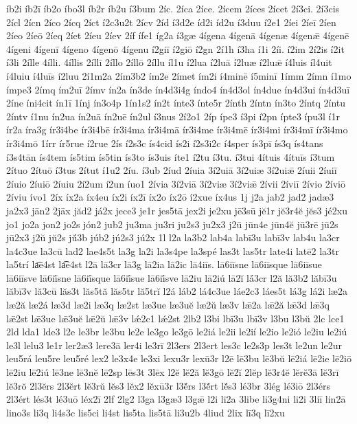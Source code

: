 {íb2i
íb2ī
íb2o
íbo3l
íb2r
íb2u
í3bum
2íc.
2íca
2íce.
2ícem
2íces
2ícet
2í3ci.
2í3cis
2ícl
2ícn
2íco
2ícq
2íct
í2c3u2t
2ícv
2íd
í3d2e
íd2i
íd2u
í3duu
í2e1
2íei
2íeī
2íen
2íeo
2íeō
2íeq
2íet
2íeu
2íev
2íf
ífe1
íg2a
í3gæ
4ígena
4ígenā
4ígenæ
4ígenǣ
4ígenē
4ígeni
4ígenī
4ígeno
4ígenō
4ígenu
í2giī
í2giō
í2gn
2í1h
í3ha
í1i
2íi.
í2im
2í2is
í2it
í3li
2ílle
4ílli.
4íllis
2íllī
2íllo
2íllō
2íllu
íl1u
í2lua
í2luā
í2luæ
í2luǣ
í4luis
íl4uit
í4luiu
í4luīs
í2luu
2í1m2a
2ím3b2
ím2e
2ímet
ím2i
í4minē
í5minī
1ímm
2ímn
í1mo
ímpe3
2ímq
ím2uī
2ímv
ín2a
ín3de
ín4d3i4g
índo4
ín4d3ol
ín4due
ín4d3ui
ín4d3uī
2íne
íni4cit
ín1ī
1ínj
ín3o4p
1ín1s2
ín2t
ínte3
ínte5r
2ínth
2íntn
ín3to
2íntq
2íntu
2íntv
í1nu
ín2ua
ín2uā
ín2uē
ín2ul
í3nus
2í2o1
2íp
ípe3
í3pi
í2pn
ípte3
ípu3l
í1r
ír2a
íra3g
ír3i4be
ír3i4bē
ír3i4ma
ír3i4mā
ír3i4me
ír3i4mē
ír3i4mi
ír3i4mī
ír3i4mo
ír3i4mō
1írr
ír5rue
í2rue
2ís
í2s3c
ís4cid
ís2i
í2s3i2c
í4sper
ís3pī
ís3q
ís4tans
í3s4tān
ís4tem
ís5tim
ís5tin
ís3to
ís3uis
íte1
í2tu
í3tu.
í3tui
4ítuis
4ítuīs
í3tum
2ítuo
2ítuō
í3tus
2ítut
í1u2
2íu.
í3ub
2íud
2íuia
3í2uiā
3í2uiæ
3í2uiǣ
2íuii
2íuiī
2íuio
2íuiō
2íuiu
2í2um
í2un
íuo1
2ívia
3í2viā
3í2viæ
3í2viǣ
2ívii
2íviī
2ívio
2íviō
2íviu
ívo1
2íx
íx2a
íx4eu
íx2i
íx2ī
íx2o
íx2ō
í2xue
íx4us
1j
j2a
jab2
jad2
jadæ3
ja2x3
jān2
2jāx
jăd2
já2x
jece3
je1r
jes5tā
jex2i
je2xu
jē3sū
jĕ1r
jĕ3r4ĕ
jĕs3
jé2xu
jo1
jo2a
jon2
jo2s
jón2
jub2
ju3ma
ju3ri
ju2s3
ju2x3
j2ū
jūn4e
jūn4ĕ
jū3rē
jū2s
jū2x3
j2ŭ
jŭ2s
jŭ́3b
júb2
jú2s3
jú2x
1l
l2a
la3b2
lab4a
labī3u
labī3v
lab4u
la3cr
la4c3ue
la3cū
lad2
lae4s5t
la3g
la2i
la3s4pe
la3spé
las3t
las5tr
late4i
latē2
la3tr
la5trí
la͞e4st
la͡e4st
l2ā
lā3cr
lā3g
lā2ia
lā2ic
lā4iīs.
lā6iīsne
lā6iīsque
lā6iīsue
lā6iīsve
lā6iī́sne
lā6iī́sque
lā6iī́sue
lā6iī́sve
lā2iu
lā2iú
lā2ĭ
lā́3cr
l2ă
lă3b2
lăbī3u
lăbī3v
lă3cū
lăs3t
lăs5tă
lăs5tr
lă5trĭ
l2á
láb2
lá4c3ue
láe2c3
láes5t
lá3g
lá2i
læ2a
læ2ă
læ2á
læ3d
læ2i
læ3q
læ2st
læ3ue
læ3uĕ
læ2ŭ
læ3v
lǣ2a
lǣ2ă
lǣ3d
lǣ3q
lǣ2st
lǣ3ue
lǣ3uĕ
lǣ2ŭ
lǣ3v
lǽ2c1
lǽ2st
2lb2
l3bi
lbī3u
lbī3v
l3bu
l3bŭ
2lc
lce1
2ld
lda1
lde3
l2e
le3br
le3bu
le2e
le3go
le3gō
le2iá
le2ii
le2ií
le2io
le2ió
le2iu
le2iú
le3l
lelu3
le1r
ler2æ3
lere3ā
ler4i
le3rī
2l3ers
2l3ert
les3c
le2s3p
les3t
le2un
le2ur
leu5rá
leu5re
leu5ré
lex2
le3x4e
le3xi
lexu3r
lexū3r
l2ē
lē3bu
lē3bŭ
lē2iá
lē2ie
lē2iō
lē2iu
lē2iú
lē3ne
lē3nĕ
lē2sp
lēs3t
3lēx
l2ĕ
lĕ2ă
lĕ3gō
lĕ2ĭ
2lĕp
lĕ3r4ĕ
lĕrĕ3ā
lĕ3rī
lĕ3rŏ
2l3ĕrs
2l3ĕrt
lĕ3rŭ
lĕs3
lĕx2
lĕxū3r
l3ĕ́rs
l3ĕ́rt
lĕ́s3
lé3br
3lég
lé3iō
2l3érs
2l3ért
lés3t
lé3uō
léx2ī
2lf
2lg2
l3ga
l3gæ3
l3gǣ
l2i
li2a
3libe
li3g4ni
li2i
3liī
lin2ā
lino3s
li3q
li4s3c
lis5ci
li4st
lis5ta
lis5tā
li3u2b
4liud
2lix
lī3q
lī2xu
}
